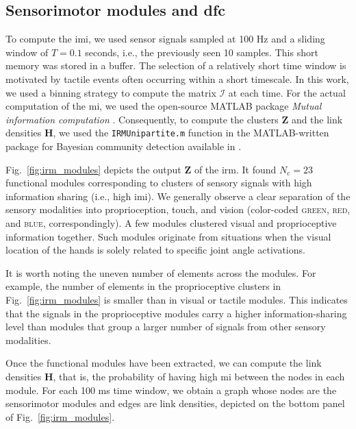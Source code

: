 \documentclass[letterpaper, 10 pt, conference]{ieeeconf}  %
\begin{document}
\subsection{Sensorimotor modules and \ac{dfc}}
To compute the \ac{imi}, we used sensor signals sampled at 100 Hz and a sliding window of $T = 0.1$ seconds, i.e., the previously seen 10 samples. This short memory was stored in a buffer. The selection of a relatively short time window is motivated by tactile events often occurring within a short timescale. In this work, we used a binning strategy to compute the matrix $\bm{\mathcal{I}}$ at each time. For the actual computation of the \ac{mi}, we used the open-source MATLAB package \emph{Mutual information computation} \cite{PengMutualInformationcomputation}. Consequently, to compute the clusters $\bm{Z}$ and the link densities $\bm{H}$, we used the \texttt{IRMUnipartite.m} function in the MATLAB-written package for Bayesian community detection available in \cite{Morup2025IRM}. 

Fig.~\ref{fig:irm_modules} depicts the output $\bm{Z}$ of the \ac{irm}. It found $N_\text{c} = 23$ functional modules corresponding to clusters of sensory signals with high information sharing (i.e., high \ac{imi}). We generally observe a clear separation of the sensory modalities into proprioception, touch, and vision (color-coded \textsc{green}, \textsc{red}, and \textsc{blue}, correspondingly). A few modules clustered visual and proprioceptive information together. Such modules originate from situations when the visual location of the hands is solely related to specific joint angle activations. 

It is worth noting the uneven number of elements across the modules. For example, the number of elements in the proprioceptive clusters in Fig.~\ref{fig:irm_modules} is smaller than in visual or tactile modules. This indicates that the signals in the proprioceptive modules carry a higher information-sharing level than modules that group a larger number of signals from other sensory modalities.

Once the functional modules have been extracted, we can compute the link densities $\bm{H}$, that is, the probability of having high \ac{mi} between the nodes in each module. For each 100 ms time window, we obtain a graph whose nodes are the sensorimotor modules and edges are link densities, depicted on the bottom panel of Fig.~\ref{fig:irm_modules}.

\end{document}
